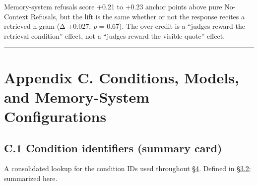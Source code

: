 Memory-system refusals score +0.21 to +0.23 anchor points above pure
No-Context Refusals, but the lift is the same whether or not the
response recites a retrieved n-gram (Δ +0.027, \emph{p} = 0.67). The
over-credit is a ``judges reward the retrieval condition'' effect, not a
``judges reward the visible quote'' effect.

\begin{center}\rule{0.5\linewidth}{0.5pt}\end{center}

\hypertarget{appendix-c.-conditions-models-and-memory-system-configurations}{%
\section{Appendix C. Conditions, Models, and Memory-System
Configurations}\label{appendix-c.-conditions-models-and-memory-system-configurations}}

\hypertarget{c.1-condition-identifiers-summary-card}{%
\subsection{C.1 Condition identifiers (summary
card)}\label{c.1-condition-identifiers-summary-card}}

A consolidated lookup for the condition IDs used throughout \hyperref[results]{§4}. Defined
in \hyperref[experimental-conditions]{§3.2}; summarized here.

